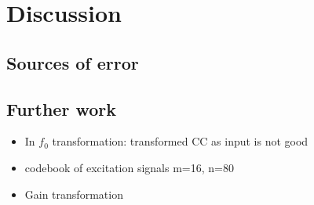 \chapter{Discussion} %
\label{cha:discussion}

\section{Sources of error} %
\label{sec:sources_of_error}



\section{Further work} %
\label{sec:further_work}
\begin{itemize}
	\item In $f_0$ transformation: transformed CC as input is not good
	\item codebook of excitation signals m=16, n=80
	\item Gain transformation
\end{itemize}
